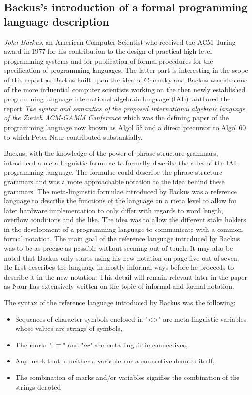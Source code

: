 \documentclass{article}
\begin{document}
\subsection{Backus's introduction of a formal programming language description}
\textit{John Backus}, an American Computer Scientist who received the ACM Turing award in 1977 for his contribution to the design of practical high-level programming systems and for publication of formal procedures for the specification of programming languages. The latter part is interesting in the scope of this report as Backus built upon the idea of Chomsky and Backus was also one of the more influential computer scientists working on the then newly established programming language international algebraic language (IAL). \citet{Backus1959TheSA} authored the report \textit{The syntax and semantics of the proposed international algebraic language of the Zurich ACM-GAMM Conference} which was the defining paper of the programming language now known as Algol 58 and a direct precursor to Algol 60 to which Peter Naur contributed substantially.

Backus, with the knowledge of the power of phrase-structure grammars, introduced a meta-linguistic formulae to formally describe the rules of the IAL programming language. The formulae could describe the phrase-structure grammars and was a more approachable notation to the idea behind these grammars. The meta-linguistic formulae introduced by Backus was a reference language to describe the functions of the language on a meta level to allow for later hardware implementation to only differ with regards to word length, overflow conditions and the like. The idea was to allow the different stake holders in the development of a programming language to communicate with a common, formal notation. The main goal of the reference language introduced by Backus was to be as precise as possible without seeming out of touch. It may also be noted that Backus only starts using his new notation on page five out of seven. He first describes the language in mostly informal ways before he proceeds to describe it in the new notation. This detail will remain relevant later in the paper as Naur has extensively written on the topic of informal and formal notation.

The syntax of the reference language introduced by Backus was the following:
\begin{itemize}
	\item Sequences of character symbols enclosed in "<>" are meta-linguistic variables whose values are strings of symbols,
	\item The marks ":$\equiv$" and "$or$" are meta-linguistic connectives,
	\item Any mark that is neither a variable nor a connective denotes itself,
	\item The combination of marks and/or variables signifies the combination of the strings denoted
\end{itemize} 
\end{document}
